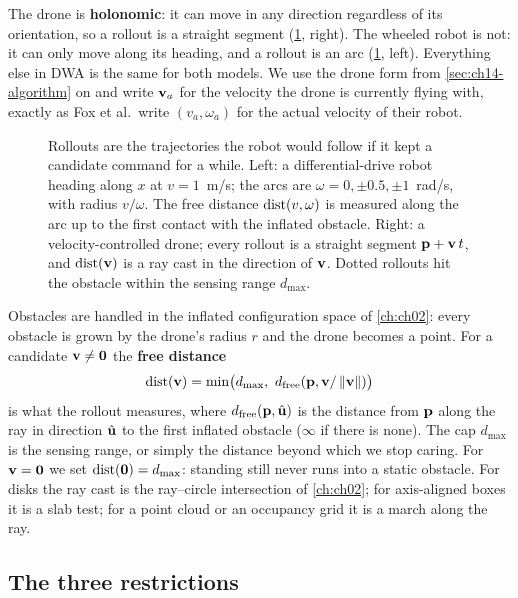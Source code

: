 The drone is \textbf{holonomic}: it can move in any direction
regardless of its orientation, so a rollout is a straight segment
(\cref{fig:ch14-rollouts}, right). The wheeled robot is not: it can only move
along its heading, and a rollout is an arc (\cref{fig:ch14-rollouts}, left).
Everything else in DWA is the same for both models. We use the drone form from
\cref{sec:ch14-algorithm} on and write $\mathbf{v}_a$ for the velocity the drone is
currently flying with, exactly as Fox et al.\ write $(v_a, \omega_a)$ for the
actual velocity of their robot.

\begin{figure}[tb]
  \centering
  \caption{Rollouts are the trajectories the robot would follow if it kept a
  candidate command for a while. Left: a differential-drive robot heading
  along $x$ at $v = 1$~m/s; the arcs are $\omega = 0, \pm 0.5, \pm 1$~rad/s,
  with radius $v/\omega$. The free distance $\operatorname{dist}(v, \omega)$ is measured
  along the arc up to the first contact with the inflated obstacle. Right: a
  velocity-controlled drone; every rollout is a straight segment
  $\mathbf{p} + \mathbf{v}\,t$, and $\operatorname{dist}(\mathbf{v})$ is a ray cast in the direction of
  $\mathbf{v}$. Dotted rollouts hit the obstacle within the sensing range
  $d_{\max}$.}
  \label{fig:ch14-rollouts}
\end{figure}

Obstacles are handled in the inflated configuration space of \cref{ch:ch02}:
every obstacle is grown by the drone's radius $r$ and the drone becomes a
point. For a candidate $\mathbf{v} \ne \mathbf{0}$ the \textbf{free distance}
\begin{equation}
  \operatorname{dist}(\mathbf{v}) = \min\bigl(d_{\max},\ d_{\mathrm{free}}(\mathbf{p}, \mathbf{v}/\left\lVert \mathbf{v} \right\rVert)\bigr)
  \label{eq:ch14-dist}
\end{equation}
is what the rollout measures, where $d_{\mathrm{free}}(\mathbf{p}, \hat{\mathbf{u}})$
is the distance from $\mathbf{p}$ along the ray in direction $\hat{\mathbf{u}}$ to the
first inflated obstacle ($\infty$ if there is none). The
cap $d_{\max}$ is the
sensing range, or simply the distance beyond which we stop caring. For
$\mathbf{v} = \mathbf{0}$ we set $\operatorname{dist}(\mathbf{0}) = d_{\max}$: standing still never
runs into a static obstacle. For disks the ray cast is the ray--circle
intersection of \cref{ch:ch02}; for axis-aligned boxes it is a slab test; for
a point cloud or an occupancy grid it is a march along the ray.

\subsection{The three restrictions}
\label{sec:ch14-restrictions}

